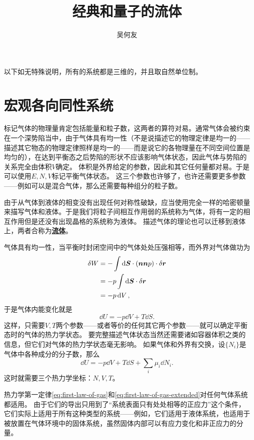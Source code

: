 \documentclass[hyperref, UTF8, a4paper]{ctexart}
\title{经典和量子的流体}
\author{吴何友}
\newcommand{\concept}[1]{\underline{\textbf{#1}}}
\begin{document}
\maketitle

以下如无特殊说明，所有的系统都是三维的，并且取自然单位制。

\section{宏观各向同性系统}

标记气体的物理量肯定包括能量和粒子数，这两者的算符对易。通常气体会被约束在一个深势陷当中，由于气体具有均一性（不是说描述它的物理定律是均一的——描述其它物态的物理定律照样是均一的——而是说它的各物理量在不同空间位置是均匀的），在达到平衡态之后势陷的形状不应该影响气体状态，因此气体与势陷的关系完全由体积$V$确定。
体积是外界给定的参数，因此和其它任何量都对易。于是可以使用$E, N, V$标记平衡气体状态。
这三个参数也许够了，也许还需要更多参数——例如可以是混合气体，那么还需要每种组分的粒子数。

由于从气体到液体的相变没有出现任何对称性破缺，应当使用完全一样的哈密顿量来描写气体和液体。于是我们将粒子间相互作用弱的系统称为气体，将有一定的相互作用但是还没有出现晶格的系统称为液体。
描述气体的理论也可以迁移到液体上，两者合称为\concept{流体}。

气体具有均一性，当平衡时封闭空间中的气体处处压强相等，而外界对气体做功为
\[
    \begin{aligned}
        \var{W} &= - \int \dd{\vb*{S}} \cdot (\vb*{n} \vb*{n} p) \cdot \var{\vb*{r}} \\
        &= - p \int \dd{\vb*{S}} \cdot \var{\vb*{r}} \\
        &= - p \dd{V}, 
    \end{aligned}
\]
于是气体内能变化就是
\begin{equation}
    \dd{U} = -p \dd{V} + T \dd{S}.
    \label{eq:first-law-of-gas}
\end{equation}
这样，只需要$V, T$两个参数——或者等价的任何其它两个参数——就可以确定平衡态时的气体的热力学状态。
要完整描述气体状态当然还需要诸如容器体积之类的信息，但它们对气体的热力学状态毫无影响。
如果气体和外界有交换，设$\{N_i\}$是气体中各种成分的分子数，那么
\begin{equation}
    \dd{U} = -p \dd{V} + T \dd{S} + \sum_i \mu_i \dd{N_i}.
    \label{eq:first-law-of-gas-extended}
\end{equation}
这时就需要三个热力学坐标：$N, V, T$。

热力学第一定律\eqref{eq:first-law-of-gas}和\eqref{eq:first-law-of-gas-extended}对任何气体系统都适用。
由于它们的导出只用到了“系统表面只有处处相等的正应力”这个条件，它们实际上适用于所有这种类型的系统——例如，它们适用于液体系统，也适用于被放置在气体环境中的固体系统，虽然固体内部可以有应力变化和非正应力的分量。
\end{document}
